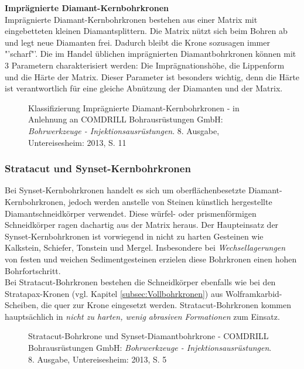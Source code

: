 \documentclass[12pt,a4paper,draft]{scrartcl} %
\begin{document}
\newpage
\textbf{Imprägnierte Diamant-Kernbohrkronen}\\

Imprägnierte Diamant-Kernbohrkronen bestehen aus einer Matrix mit eingebetteten kleinen Diamantsplittern. Die Matrix nützt sich beim Bohren ab und legt neue Diamanten frei. Dadurch bleibt die Krone sozusagen immer "'scharf"'. Die im Handel üblichen imprägnierten Diamantbohrkronen können mit 3 Parametern charakterisiert werden: Die Imprägnationshöhe, die Lippenform und die Härte der Matrix. Dieser Parameter ist besonders wichtig, denn die Härte ist verantwortlich für eine gleiche Abnützung der Diamanten und der Matrix.

\begin{figure}[H]
\centering
\caption{Klassifizierung Imprägnierte Diamant-Kernbohrkronen - in Anlehnung an COMDRILL Bohrausrüstungen GmbH: \emph{Bohrwerkzeuge - Injektionsausrüstungen}. 8. Ausgabe, Untereisesheim: 2013, S. 11}
\end{figure}


\subsubsection{Stratacut und Synset-Kernbohrkronen}
Bei Synset-Kernbohrkronen handelt es sich um oberflächenbesetzte Diamant-Kernbohrkronen, jedoch werden anstelle von Steinen künstlich hergestellte Diamantschneidkörper verwendet. Diese würfel- oder prismenförmigen Schneidkörper ragen dachartig aus der Matrix heraus. Der Haupteinsatz der Synset-Kernbohrkronen ist vorwiegend in nicht zu harten Gesteinen wie Kalkstein, Schiefer, Tonstein und Mergel. Insbesondere bei \emph{Wechsellagerungen} von festen und weichen Sedimentgesteinen erzielen diese Bohrkronen einen hohen Bohrfortschritt.\\
Bei Stratacut-Bohrkronen bestehen die Schneidkörper ebenfalls wie bei den Stratapax-Kronen (vgl. Kapitel \ref{subsec:Vollbohrkronen}) aus Wolframkarbid-Scheiben, die quer zur Krone eingesetzt werden. Stratacut-Bohrkronen kommen hauptsächlich in \emph{nicht zu harten, wenig abrasiven Formationen} zum Einsatz.

\begin{figure}[H]
\centering
\caption{Stratacut-Bohrkrone und Synset-Diamantbohrkrone - COMDRILL Bohrausrüstungen GmbH: \emph{Bohrwerkzeuge - Injektionsausrüstungen}. 8. Ausgabe, Untereisesheim: 2013, S. 5}
\end{figure}
\end{document}
